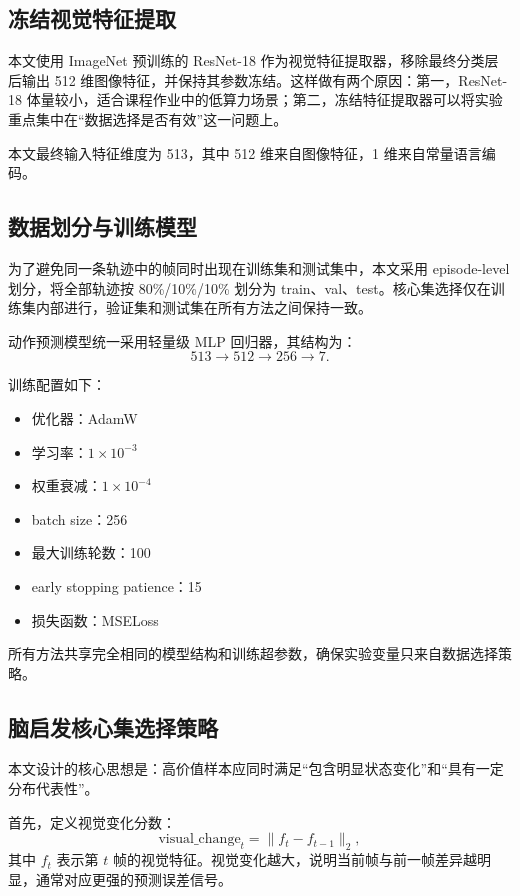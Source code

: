 \documentclass[UTF8,a4paper,12pt]{ctexart}
\begin{document}
\subsection{冻结视觉特征提取}

本文使用 ImageNet 预训练的 ResNet-18 作为视觉特征提取器，移除最终分类层后输出 512 维图像特征，并保持其参数冻结。这样做有两个原因：第一，ResNet-18 体量较小，适合课程作业中的低算力场景；第二，冻结特征提取器可以将实验重点集中在“数据选择是否有效”这一问题上。

本文最终输入特征维度为 513，其中 512 维来自图像特征，1 维来自常量语言编码。

\subsection{数据划分与训练模型}

为了避免同一条轨迹中的帧同时出现在训练集和测试集中，本文采用 episode-level 划分，将全部轨迹按 80\%/10\%/10\% 划分为 train、val、test。核心集选择仅在训练集内部进行，验证集和测试集在所有方法之间保持一致。

动作预测模型统一采用轻量级 MLP 回归器，其结构为：
\[
513 \rightarrow 512 \rightarrow 256 \rightarrow 7.
\]

训练配置如下：
\begin{itemize}
  \item 优化器：AdamW
  \item 学习率：$1\times10^{-3}$
  \item 权重衰减：$1\times10^{-4}$
  \item batch size：256
  \item 最大训练轮数：100
  \item early stopping patience：15
  \item 损失函数：MSELoss
\end{itemize}

所有方法共享完全相同的模型结构和训练超参数，确保实验变量只来自数据选择策略。

\subsection{脑启发核心集选择策略}

本文设计的核心思想是：高价值样本应同时满足“包含明显状态变化”和“具有一定分布代表性”。

首先，定义视觉变化分数：
\[
\text{visual\_change}_t = \lVert f_t - f_{t-1} \rVert_2,
\]
其中 $f_t$ 表示第 $t$ 帧的视觉特征。视觉变化越大，说明当前帧与前一帧差异越明显，通常对应更强的预测误差信号。
\end{document}
